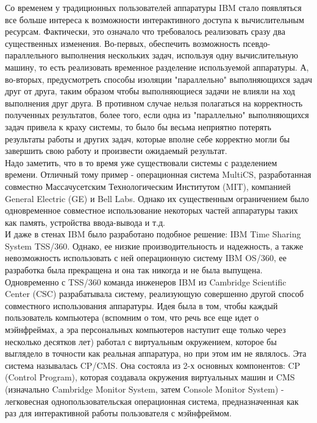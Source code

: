 \documentclass[14pt, a4paper]{article}
\begin{document}
Со временем у традиционных пользователей аппаратуры IBM стало появляться все
больше интереса к возможности интерактивного доступа к вычислительным ресурсам.
Фактически, это означало что требовалось реализовать сразу два существенных
изменения. Во-первых, обеспечить возможность псевдо-параллельного выполнения
нескольких задач, используя одну вычислительную машину, то есть реализовать
временное разделение используемой аппаратуры. А, во-вторых, предусмотреть
способы изоляции "параллельно" выполняющихся задач друг от друга, таким образом
чтобы выполняющиеся задачи не влияли на ход выполнения друг друга. В противном
случае нельзя полагаться на корректность полученных результатов, более того, если
одна из "параллельно" выполняющихся задач привела к краху системы, то было бы
весьма неприятно потерять результаты работы и других задач, которые вполне себе
корректно могли бы завершить свою работу и произвести ожидаемый результат.\\

Надо заметить, что в то время уже существовали системы с разделением времени.
Отличный тому пример - операционная система MultiCS, разработанная совместно
Массачусетским Технологическим Институтом (MIT), компанией General Electric (GE) и Bell Labs. Однако их существенным ограничением было одновременное совместное
использование некоторых частей аппаратуры таких как память, устройства
ввода-вывода и т.д.\\

И даже в стенах IBM было разработано подобное решение: IBM Time Sharing System
TSS/360. Однако, ее низкие производительность и надежность, а также невозможность
использовать с ней операционную систему IBM OS/360, ее разработка была
прекращена и она так никогда и не была выпущена.\\

Одновременно с TSS/360 команда инженеров IBM из Cambridge Scientific Center (CSC)
разрабатывала систему, реализующую совершенно другой способ совместного
использования аппаратуры. Идея была в том, чтобы каждый пользователь компьютера
(вспомним о том, что речь все еще идет о мэйнфреймах, а эра персональных
компьютеров наступит еще только через несколько десятков лет) работал с
виртуальным окружением, которое бы выглядело в точности как реальная аппаратура,
но при этом им не являлось. Эта система называлась CP/CMS. Она состояла из 2-х
основных компонентов: CP (Control Program), которая создавала окружения
виртуальных машин и CMS (изначально Cambridge Monitor System, затем Console
Monitor System) - легковесная однопользовательская операционная система,
предназначенная как раз для интерактивной работы пользователя с мэйнфреймом.\\
\end{document}
